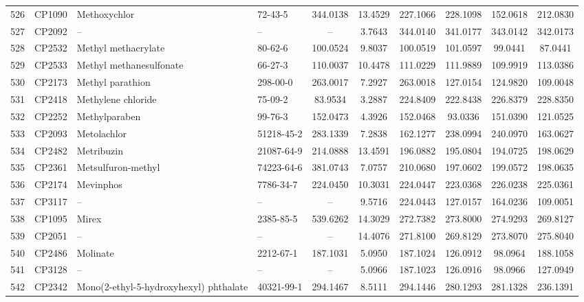 \begin{longtable}{clllcccccc}
526 & CP1090 & Methoxychlor\smash{\textsuperscript{\textdaggerdbl}} & 72-43-5 & 344.0138 & 13.4529 & 227.1066 & 228.1098 & 152.0618 & 212.0830 \\ 
527 & CP2092 & – & – & – & 3.7643 & 344.0140 & 341.0177 & 343.0142 & 342.0173 \\ 
528 & CP2532 & Methyl methacrylate & 80-62-6 & 100.0524 & 9.8037 & 100.0519 & 101.0597 & 99.0441 & 87.0441 \\ 
529 & CP2533 & Methyl methanesulfonate\smash{\textsuperscript{\textdaggerdbl}} & 66-27-3 & 110.0037 & 10.4478 & 111.0229 & 111.9889 & 109.9919 & 113.0386 \\ 
530 & CP2173 & Methyl parathion & 298-00-0 & 263.0017 & 7.2927 & 263.0018 & 127.0154 & 124.9820 & 109.0048 \\ 
531 & CP2418 & Methylene chloride & 75-09-2 & 83.9534 & 3.2887 & 224.8409 & 222.8438 & 226.8379 & 228.8350 \\ 
532 & CP2252 & Methylparaben\smash{\textsuperscript{\textdaggerdbl}} & 99-76-3 & 152.0473 & 4.3926 & 152.0468 & 93.0336 & 151.0390 & 121.0525 \\ 
533 & CP2093 & Metolachlor & 51218-45-2 & 283.1339 & 7.2838 & 162.1277 & 238.0994 & 240.0970 & 163.0627 \\ 
534 & CP2482 & Metribuzin & 21087-64-9 & 214.0888 & 13.4591 & 196.0882 & 195.0804 & 194.0725 & 198.0629 \\ 
535 & CP2361 & Metsulfuron-methyl & 74223-64-6 & 381.0743 & 7.0757 & 210.0680 & 197.0602 & 199.0572 & 198.0635 \\ 
536 & CP2174 & Mevinphos & 7786-34-7 & 224.0450 & 10.3031 & 224.0447 & 223.0368 & 226.0238 & 225.0361 \\ 
537 & CP3117 & – & – & – & 9.5716 & 224.0443 & 127.0157 & 164.0236 & 109.0051 \\ 
538 & CP1095 & Mirex & 2385-85-5 & 539.6262 & 14.3029 & 272.7382 & 273.8000 & 274.9293 & 269.8127 \\ 
539 & CP2051 & – & – & – & 14.4076 & 271.8100 & 269.8129 & 273.8070 & 275.8040 \\ 
540 & CP2486 & Molinate\smash{\textsuperscript{\textdaggerdbl}} & 2212-67-1 & 187.1031 & 5.0950 & 187.1024 & 126.0912 & 98.0964 & 188.1058 \\ 
541 & CP3128 & – & – & – & 5.0966 & 187.1023 & 126.0916 & 98.0966 & 127.0949 \\ 
542 & CP2342 & Mono(2-ethyl-5-hydroxyhexyl) phthalate & 40321-99-1 & 294.1467 & 8.5111 & 294.1446 & 280.1293 & 281.1328 & 236.1391 \\ 

\end{longtable}
